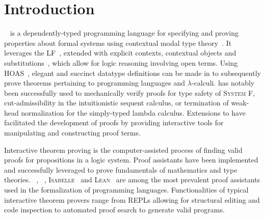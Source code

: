 \chapter{Introduction}\label{chapter:introduction}






\Beluga~\cite{pientka2010beluga} is a dependently-typed programming language for specifying and proving properties about formal systems using contextual modal type theory~\cite{nanevski2008contextual}.
It leverages the \acf{LF}~\cite{harper1993framework}, extended with explicit contexts, contextual objects and substitutions~\cite{DBLP:journals/corr/abs-1009-2789, cave2013first}, which allow for logic reasoning involving open terms.
Using \ac{HOAS}~\cite{pfenning1988higher}, elegant and succinct datatype definitions can be made in \LF to subsequently prove theorems pertaining to programming languages and $ \lambda $-calculi.
\Beluga has notably been successfully used to mechanically verify proofs for type safety of \textsc{System F}, cut-admissibility in the intuitionistic sequent calculus, or termination of weak-head normalization for the simply-typed lambda calculus.
Extensions to \Beluga have facilitated the development of proofs by providing interactive tools for manipulating and constructing proof terms.



Interactive theorem proving is the computer-assisted process of finding valid proofs for propositions in a logic system.
Proof assistants have been implemented and successfully leveraged to prove fundamentals of mathematics and type theories.
\Agda~\cite{clffolp}, \Coq~\cite{Coq, bertot2013interactive}, \textsc{Isabelle}~\cite{nipkow2002isabelle} and \textsc{Lean}~\cite{lean4} are among the most prevalent proof assistants used in the formalization of programming languages.
Functionalities of typical interactive theorem provers range from \acp{REPL} allowing for structural editing and code inspection to automated proof search to generate valid programs.

